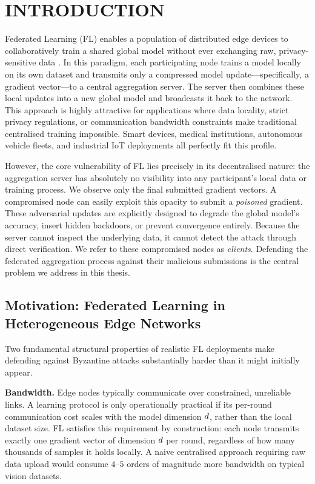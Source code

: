 \documentclass[../main.tex]{subfiles}
\begin{document}
\chapter{INTRODUCTION}
\label{ch:introduction}

Federated Learning (FL) enables a population of distributed edge devices to collaboratively train a shared global model without ever exchanging raw, privacy-sensitive data \citep{mcmahan2017communication}. In this paradigm, each participating node trains a model locally on its own dataset and transmits only a compressed model update---specifically, a gradient vector---to a central aggregation server. The server then combines these local updates into a new global model and broadcasts it back to the network. This approach is highly attractive for applications where data locality, strict privacy regulations, or communication bandwidth constraints make traditional centralised training impossible. Smart devices, medical institutions, autonomous vehicle fleets, and industrial IoT deployments all perfectly fit this profile.

However, the core vulnerability of FL lies precisely in its decentralised nature: the aggregation server has absolutely no visibility into any participant's local data or training process. We observe only the final submitted gradient vectors. A compromised node can easily exploit this opacity to submit a \emph{poisoned} gradient. These adversarial updates are explicitly designed to degrade the global model's accuracy, insert hidden backdoors, or prevent convergence entirely. Because the server cannot inspect the underlying data, it cannot detect the attack through direct verification. We refer to these compromised nodes as \emph{\byz{} clients}. Defending the federated aggregation process against their malicious submissions is the central problem we address in this thesis.

\section{Motivation: Federated Learning in Heterogeneous Edge Networks}
\label{sec:intro_motivation}

Two fundamental structural properties of realistic FL deployments make defending against Byzantine attacks substantially harder than it might initially appear.

\textbf{Bandwidth.}
Edge nodes typically communicate over constrained, unreliable links. A learning protocol is only operationally practical if its per-round communication cost scales with the model dimension $d$, rather than the local dataset size. FL satisfies this requirement by construction: each node transmits exactly one gradient vector of dimension $d$ per round, regardless of how many thousands of samples it holds locally. A naive centralised approach requiring raw data upload would consume $4$--$5$ orders of magnitude more bandwidth on typical vision datasets.
\end{document}
